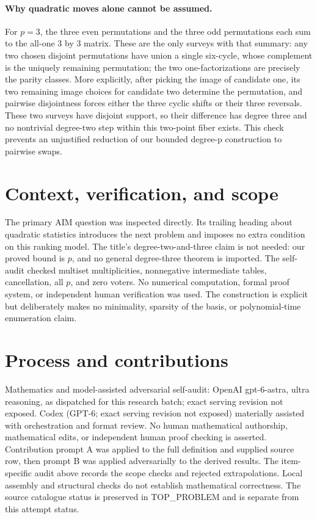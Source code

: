 \documentclass[11pt]{article}
\begin{document}
\paragraph{Why quadratic moves alone cannot be assumed.}
For $p=3$, the three even permutations and the three odd permutations
each sum to the all-one $3$ by $3$ matrix. These are the only surveys
with that summary: any two chosen disjoint permutations have union a
single six-cycle, whose complement is the uniquely remaining permutation;
the two one-factorizations are precisely the parity classes. More explicitly,
after picking the image of candidate one, its two remaining image choices
for candidate two determine the permutation, and pairwise disjointness
forces either the three cyclic shifts or their three reversals.
These two surveys have disjoint support, so their difference has degree
three and no nontrivial degree-two step within this two-point fiber exists.
This check prevents an unjustified reduction of our bounded degree-p
construction to pairwise swaps.

\section{Context, verification, and scope}
The primary AIM question was inspected directly. Its trailing heading
about quadratic statistics introduces the next problem and imposes no
extra condition on this ranking model. The title's degree-two-and-three
claim is not needed: our proved bound is $p$, and no general degree-three
theorem is imported. The self-audit checked multiset multiplicities,
nonnegative intermediate tables, cancellation, all $p$, and zero voters.
No numerical computation, formal proof system, or independent human
verification was used. The construction is explicit but deliberately makes
no minimality, sparsity of the basis, or polynomial-time enumeration claim.

\section{Process and contributions}
Mathematics and model-assisted adversarial self-audit: OpenAI gpt-6-astra, ultra reasoning, as dispatched for this research batch; exact serving revision not exposed. Codex (GPT-6; exact serving revision not exposed) materially assisted with orchestration and format review. No human mathematical authorship, mathematical edits, or independent human proof checking is asserted.
Contribution prompt A was applied to the full definition and supplied source row, then prompt B was applied adversarially to the derived results. The item-specific audit above records the scope checks and rejected extrapolations. Local assembly and structural checks do not establish mathematical correctness. The source catalogue status is preserved in TOP\_PROBLEM and is separate from this attempt status.
\end{document}
